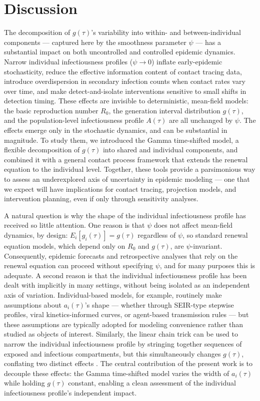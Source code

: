 \clearpage
\section{Discussion}

The decomposition of $g(\tau)$'s variability into within- and between-individual components --- captured here by the smoothness parameter $\psi$ --- has a substantial impact on both uncontrolled and controlled epidemic dynamics. Narrow individual infectiousness profiles ($\psi \rightarrow 0$) inflate early-epidemic stochasticity, reduce the effective information content of contact tracing data, introduce overdispersion in secondary infection counts when contact rates vary over time, and make detect-and-isolate interventions sensitive to small shifts in detection timing. These effects are invisible to deterministic, mean-field models: the basic reproduction number $R_0$, the generation interval distribution $g(\tau)$, and the population-level infectiousness profile $A(\tau)$ are all unchanged by $\psi$. The effects emerge only in the stochastic dynamics, and can be substantial in magnitude. To study them, we introduced the Gamma time-shifted model, a flexible decomposition of $g(\tau)$ into shared and individual components, and combined it with a general contact process framework that extends the renewal equation to the individual level. Together, these tools provide a parsimonious way to assess an underexplored axis of uncertainty in epidemic modeling --- one that we expect will have implications for contact tracing, projection models, and intervention planning, even if only through sensitivity analyses.

A natural question is why the shape of the individual infectiousness profile has received so little attention. One reason is that $\psi$ does not affect mean-field dynamics, by design: $E_i[g_i(\tau)] = g(\tau)$ regardless of $\psi$, so standard renewal equation models, which depend only on $R_0$ and $g(\tau)$, are $\psi$-invariant. Consequently, epidemic forecasts and retrospective analyses that rely on the renewal equation can proceed without specifying $\psi$, and for many purposes this is adequate. A second reason is that the individual infectiousness profile has been dealt with implicitly in many settings, without being isolated as an independent axis of variation. Individual-based models, for example, routinely make assumptions about $a_i(\tau)$'s shape --- whether through SEIR-type stepwise profiles, viral kinetics-informed curves, or agent-based transmission rules --- but these assumptions are typically adopted for modeling convenience rather than studied as objects of interest. Similarly, the linear chain trick can be used to narrow the individual infectiousness profile by stringing together sequences of exposed and infectious compartments, but this simultaneously changes $g(\tau)$, conflating two distinct effects \citep{wearing_appropriate_2005, lloyd_realistic_2001}. The central contribution of the present work is to decouple these effects: the Gamma time-shifted model varies the width of $a_i(\tau)$ while holding $g(\tau)$ constant, enabling a clean assessment of the individual infectiousness profile's independent impact.

